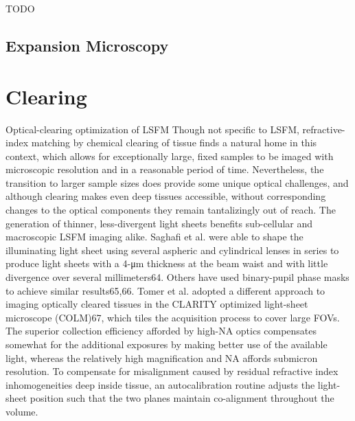   TODO \subsection{Expansion Microscopy}

  \section{Clearing}

  Optical-clearing optimization of LSFM
  Though not specific to LSFM, refractive-index matching by chemical clearing of tissue finds a natural home in this context, which allows for exceptionally large, fixed samples to be imaged with microscopic resolution and in a reasonable period of time.
  Nevertheless, the transition to larger sample sizes does provide some unique optical challenges, and although clearing makes even deep tissues accessible, without corresponding changes to the optical components they remain tantalizingly out of reach.
  The generation of thinner, less-divergent light sheets benefits sub-cellular and macroscopic LSFM imaging alike.
  Saghafi et al. were able to shape the illuminating light sheet using several aspheric and cylindrical lenses in series to produce light sheets with a 4-μm thickness at the beam waist and with little divergence over several millimeters64.
  Others have used binary-pupil phase masks to achieve similar results65,66.
  Tomer et al. adopted a different approach to imaging optically cleared tissues in the CLARITY optimized light-sheet microscope (COLM)67, which tiles the acquisition process to cover large FOVs.
  The superior collection efficiency afforded by high-NA optics compensates somewhat for the additional exposures by making better use of the available light, whereas the relatively high magnification and NA affords submicron resolution.
  To compensate for misalignment caused by residual refractive index inhomogeneities deep inside tissue, an autocalibration routine adjusts the light-sheet position such that the two planes maintain co-alignment throughout the volume.
